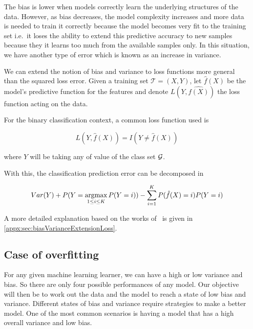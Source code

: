 The bias is lower when models correctly learn the underlying structures of the data.
However, as bias decreases, the model complexity increases and more data is needed to train it correctly because the model becomes very fit to the training set i.e.\ it loses the ability to extend this predictive accuracy to new samples because they it learns too much from the available samples only.
In this situation, we have another type of error which is known as an increase in variance.

We can extend the notion of bias and variance to loss functions more general than the squared loss error.
Given a training set $\mathcal{T} = (X,Y)$, let $\hat{f}(X)$ be the model's predictive function for the features and denote $L( Y,\hat{f(X)} )$ the loss function acting on the data.


For the binary classification context, a common loss function used is

\begin{equation}
L(Y, \hat{f}(X)) = I(Y \neq \hat{f}(X))
\end{equation}\label{eq:classificationLossFunction}

where $Y$ will be taking any of value of the class set $\operatorname{\mathcal{G}}$.

With this, the classification prediction error can be decomposed in

\begin{equation}
Var(Y) + P(Y=\operatorname*{argmax}_{1\leq i \leq K} P(Y=i)) - \sum_{i=1}^K P(\hat{f}(X) =i)P(Y=i)
\end{equation}

A more detailed explanation based on the works of~\cite{james-biasVarianceGeneral} is given in \cref{appx:sec:biasVarianceExtensionLoss}.

\subsection{Case of overfitting}\label{subsection-overfitting}

For any given machine learning learner, we can have a high or low variance and bias.
So there are only four possible performances of any model.
Our objective will then be to work out the data and the model to reach a state of low bias and variance.
Different states of bias and variance require strategies to make a better model.
One of the most common scenarios is having a model that has a high overall variance and low bias.

